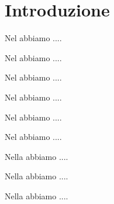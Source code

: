 %

\chapter*{Introduzione}

Nel  abbiamo ....

Nel  abbiamo ....

Nel  abbiamo ....

Nel  abbiamo ....

Nel  abbiamo ....

Nel  abbiamo ....

Nella  abbiamo ....

Nella  abbiamo ....

Nella  abbiamo ....%


